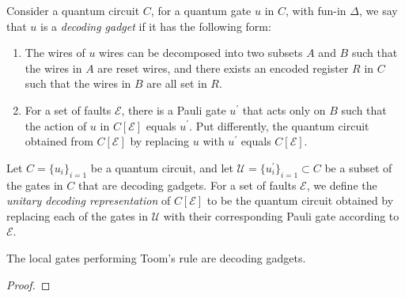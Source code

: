 \begin{definition}
  Consider a quantum circuit $C$, for a quantum gate $u$ in $C$, with fun-in $\Delta$, we say that $u$ is a \textit{decoding gadget} if it has the following form: 
  \begin{enumerate}
    \item The wires of $u$ wires can be decomposed into two subsets $A$ and $B$ such that the wires in $A$ are reset wires, and there exists an encoded register $R$ in $C$ such that the wires in $B$ are all set in $R$.
    \item For a set of faults $\mathcal{E}$, there is a Pauli gate $u^\prime$ that acts only on $B$ such that the action of $u$ in $C[\mathcal{E}]$ equals $u^{\prime}$. Put differently, the quantum circuit obtained from $C[\mathcal{E}]$ by replacing $u$ with $u^{\prime}$ equals $C[\mathcal{E}]$.
  \end{enumerate}
\end{definition}


\begin{definition}
  Let $C = \{u_{i}\}_{i=1}$ be a quantum circuit, and let $\mathcal{U} = \{u^{\prime}_{i}\}_{i=1} \subset C$ be a subset of the gates in $C$ that are decoding gadgets. For a set of faults $\mathcal{E}$, we define the \textit{unitary decoding representation} of $C[\mathcal{E}]$ to be the quantum circuit obtained by replacing each of the gates in $\mathcal{U}$ with their corresponding Pauli gate according to $\mathcal{E}$.
\end{definition}


\begin{claim}
  The local gates performing Toom's rule are decoding gadgets. 
\end{claim}
\begin{proof}
\end{proof}




